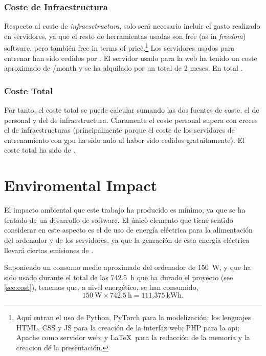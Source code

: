 \subsubsection{Coste de Infraestructura}

Respecto al coste de \emph{infraesctructura}, solo será necesario incluir el
gasto realizado en servidores, ya que el resto de herramientas usadas son free
(as in \emph{freedom}) software, pero también free in terms of
price.\footnote{Aquí entran el uso de Python, PyTorch para la modelización; los
  lenguajes HTML, CSS y JS para la creación de la interfaz web; PHP para la
  \gls{api}; Apache como servidor web; y \LaTeX\ para la redacción de la
  memoria y la creacion dé la presentación.} Los servidores usados para
entrenar han sido cedidos por . El servidor usado para la web ha tenido un coste aproximado de
/month y se ha alquilado por un total de 2 meses. En total .

\subsubsection{Coste Total}

Por tanto, el coste total se puede calcular sumando las dos fuentes de coste,
el de personal y del de infraestructura. Claramente el coste personal supera
con creces el de infraestructuras (principalmente porque el coste de los
servidores de entrenamiento con \gls{gpu} ha sido nulo al haber sido cedidos
gratuitamente). El coste total ha sido de .



\section{Enviromental Impact}\label{sec:enviromental}

El impacto ambiental que este trabajo ha producido es mínimo, ya que se ha
tratado de un desarrollo de software. El único elemento que tiene sentido
considerar en este aspecto es el de uso de energía eléctrica para la
alimentación del ordenador y de los servidores, ya que la genración de esta
energía eléctrica llevará ciertas emisiones de .

Suponiendo un consumo medio aproximado del ordenador de \SI{150}{\watt}, y que
ha sido usado durante el total de las \SI{742.5}{\hour} que ha durado el
proyecto (see \vref{sec:cost}), tenemos que, a nivel energético, se han
consumido,
\begin{equation}
  \SI{150}{\watt} \times \SI{742.5}{\hour} = \SI{111.375}{\kWh}.
\end{equation}


